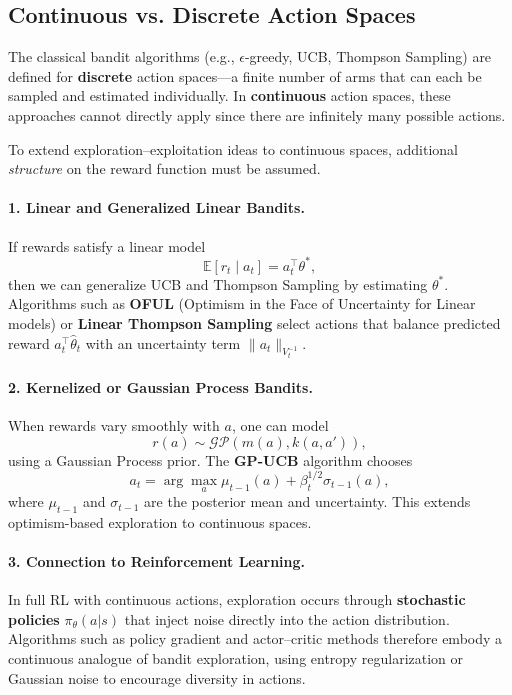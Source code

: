 \documentclass[12pt]{article}
\begin{document}
\subsection*{Continuous vs. Discrete Action Spaces}

The classical bandit algorithms (e.g., $\epsilon$-greedy, UCB, Thompson Sampling) are
defined for \textbf{discrete} action spaces---a finite number of arms that can each be
sampled and estimated individually.
In \textbf{continuous} action spaces, these approaches cannot directly apply since there
are infinitely many possible actions.

To extend exploration--exploitation ideas to continuous spaces, additional
\emph{structure} on the reward function must be assumed.

\paragraph{1. Linear and Generalized Linear Bandits.}
If rewards satisfy a linear model
\[
		\mathbb{E}[r_t \mid a_t] = a_t^\top \theta^*,
\]
then we can generalize UCB and Thompson Sampling by estimating $\theta^*$.
Algorithms such as \textbf{OFUL} (Optimism in the Face of Uncertainty for Linear models)
or \textbf{Linear Thompson Sampling} select actions that balance predicted reward
$a_t^\top \hat{\theta}_t$ with an uncertainty term $\|a_t\|_{V_t^{-1}}$.

\paragraph{2. Kernelized or Gaussian Process Bandits.}
When rewards vary smoothly with $a$, one can model
\[
		r(a) \sim \mathcal{GP}(m(a), k(a,a')),
\]
using a Gaussian Process prior.
The \textbf{GP-UCB} algorithm chooses
\[
		a_t = \arg\max_a \mu_{t-1}(a) + \beta_t^{1/2}\sigma_{t-1}(a),
\]
where $\mu_{t-1}$ and $\sigma_{t-1}$ are the posterior mean and uncertainty.
This extends optimism-based exploration to continuous spaces.

\paragraph{3. Connection to Reinforcement Learning.}
In full RL with continuous actions, exploration occurs through \textbf{stochastic
policies} $\pi_\theta(a|s)$ that inject noise directly into the action distribution.
Algorithms such as policy gradient and actor--critic methods therefore embody a
continuous analogue of bandit exploration, using entropy regularization or Gaussian noise
to encourage diversity in actions.
\end{document}
